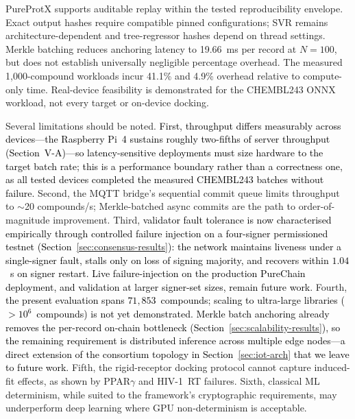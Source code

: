 \documentclass[conference]{IEEEtran}
\newcommand{\rev}[2]{#2}
\begin{document}
\rev{R1.1, R1.4, R2.1, R2.2}{PureProtX supports auditable replay
within the tested reproducibility envelope. Exact output hashes
require compatible pinned configurations; SVR remains
architecture-dependent and tree-regressor hashes depend on
thread settings. Merkle batching reduces anchoring latency to
19.66~ms per record at $N{=}100$, but does not establish
universally negligible percentage overhead. The measured
1,000-compound workloads incur 41.1\% and 4.9\% overhead
relative to compute-only time. Real-device feasibility is
demonstrated for the CHEMBL243 ONNX workload, not every
target or on-device docking.}

Several limitations should be noted. \textcolor{black}{First, throughput
differs measurably across devices---the Raspberry Pi~4 sustains roughly
two-fifths of server throughput (Section~V-A)---so latency-sensitive
deployments must size hardware to the target batch rate; this is a
performance boundary rather than a correctness one, \rev{R1.1}{as all tested devices completed the measured CHEMBL243 batches without failure}.} Second, the MQTT bridge's
sequential commit queue limits throughput to $\sim$20 compounds/s;
Merkle-batched async commits are the path to order-of-magnitude improvement.
Third, \textcolor{black}{validator fault tolerance is now characterised
empirically through controlled failure injection on a
four-signer permissioned testnet
(Section~\ref{sec:consensus-results}): the network
maintains liveness under a single-signer fault, stalls
only on loss of signing majority, and recovers within
$1.04$~s on signer restart. Live failure-injection on the
production PureChain deployment, and validation at larger
signer-set sizes, remain future work.}
Fourth, \textcolor{black}{the present evaluation spans $71{,}853$~compounds;
scaling to ultra-large libraries ($>10^6$~compounds) is
not yet demonstrated. Merkle batch anchoring already
removes the per-record on-chain bottleneck
(Section~\ref{sec:scalability-results}), so the remaining
requirement is distributed inference across multiple edge
nodes---a direct extension of the consortium topology in
Section~\ref{sec:iot-arch} that we leave to future work.}
Fifth, the rigid-receptor docking protocol cannot
capture induced-fit effects, as shown by PPAR$\gamma$
and HIV-1~RT failures.
Sixth, classical ML determinism, while suited to the
framework's cryptographic requirements, may underperform
deep learning where GPU non-determinism is acceptable.


 
\end{document}
